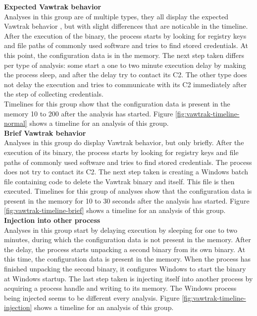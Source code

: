 \documentclass[conference]{IEEEtran}
\begin{document}
\newpage

\textbf{Expected Vawtrak behavior}
\\Analyses in this group are of multiple types, they all display the expected Vawtrak behavior \cite{kroustek-vawtrak}, but with slight differences that are noticable in the timeline. \\After the execution of the binary, the process starts by looking for registry keys and file paths of commonly used software and tries to find stored credentials. At this point, the configuration data is in the memory. The next step taken differs per type of analysis: some start a one to two minute execution delay by making the process sleep, and after the delay try to contact its C2. The other type does not delay the execution and  tries to communicate with its C2 immediately after the step of collecting credentials.\\ Timelines for this group show that the configuration data is present in the memory 10 to 200 after the analysis has started. Figure \ref{fig:vawtrak-timeline-normal} shows a timeline for an analysis of this group.\\


\textbf{Brief Vawtrak behavior}
\\Analyses in this group do display Vawtrak behavior\cite{kroustek-vawtrak}, but only briefly. After the execution of its binary, the process starts by looking for registry keys and file paths of commonly used software and tries to find stored credentials. The process does not try to contact its C2. The next step taken is creating a Windows batch file containing code to delete the Vawtrak binary and itself. This file is then executed. Timelines for this group of analyses show that the configuration data is present in the memory for 10 to 30 seconds after the analysis has started. Figure \ref{fig:vawtrak-timeline-brief} shows a timeline for an analysis of this group.\\

\textbf{Injection into other process}
\\Analyses in this group start by delaying execution by \Gls{sleeping} for one to two minutes, during which the configuration data is not present in the memory. After the delay, the process starts unpacking a second binary from its own binary. At this time, the configuration data is present in the memory. When the process has finished unpacking the second binary, it configures Windows to start the binary at Windows startup. The last step taken is injecting itself into another process by acquiring a process handle and writing to its memory. The Windows process being injected seems to be different every analysis. Figure \ref{fig:vawtrak-timeline-injection} shows a timeline for an analysis of this group.\\
\end{document}
